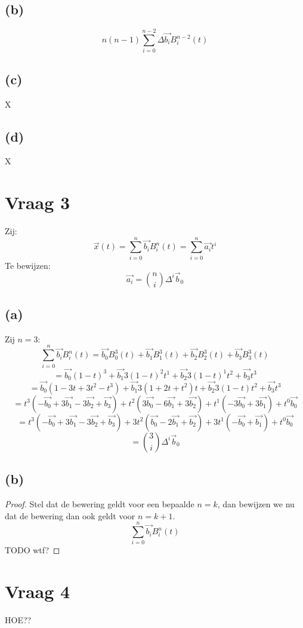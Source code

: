 \documentclass[10pt,a4paper]{article}
\begin{document}
\subsection*{(b)}
\[
n(n-1)
\sum_{i=0}^{n-2}\Delta\vec{b_{i}}B^{n-2}_{i}(t)
\]

\subsection*{(c)}
X
\subsection*{(d)}
X

\section{Vraag 3}
Zij:
\[
\vec{x}(t) = \sum_{i=0}^{n}\vec{b_{i}}B^{n}_{i}(t) = \sum_{i=0}^{n}\vec{a_{i}}t^i
\]
Te bewijzen:
\[
\vec{a_i} = \binom{n}{i}\Delta^i\vec{b}_0
\]
\subsection*{(a)}
Zij $n=3$:
\[
\sum_{i=0}^{n}\vec{b_{i}}B^{n}_{i}(t)
= \vec{b_{0}}B^{3}_{0}(t)
+ \vec{b_{1}}B^{3}_{1}(t)
+ \vec{b_{2}}B^{3}_{2}(t)
+ \vec{b_{3}}B^{3}_{3}(t)
\]
\[
= \vec{b_{0}}(1-t)^{3}
+ \vec{b_{1}}3(1-t)^{2}t^{1}
+ \vec{b_{2}}3(1-t)^{1}t^{2}
+ \vec{b_{3}}t^{3}
\]
\[
= \vec{b_{0}}(1-3t+3t^2-t^3)
+ \vec{b_{1}}3(1+2t+t^2)t
+ \vec{b_{2}}3(1-t)t^{2}
+ \vec{b_{3}}t^{3}
\]
\[
= t^3(- \vec{b_0}+3\vec{b_1}-3\vec{b_2}+\vec{b_3})
+ t^2( 3\vec{b_0}-6\vec{b_1}+3\vec{b_2})
+ t^1(-3\vec{b_0}+3\vec{b_1})
+ t^0   \vec{b_0}
\]
\[
=  t^3(-\vec{b_0}+3\vec{b_1}-3\vec{b_2}+\vec{b_3})
+ 3t^2( \vec{b_0}-2\vec{b_1}+ \vec{b_2})
+ 3t^1(-\vec{b_0}+ \vec{b_1})
+  t^0  \vec{b_0}
\]
\[
= \binom{3}{i}\Delta^i\vec{b}_0
\]

\subsection*{(b)}
\begin{proof}
Stel dat de bewering geldt voor een bepaalde $n=k$, dan bewijzen we nu dat de bewering dan ook geldt voor $n=k+1$.
\[
\sum_{i=0}^{n}\vec{b_{i}}B^{n}_{i}(t)
\]
TODO wtf?
\end{proof}

\section{Vraag 4}
HOE??
\end{document}
